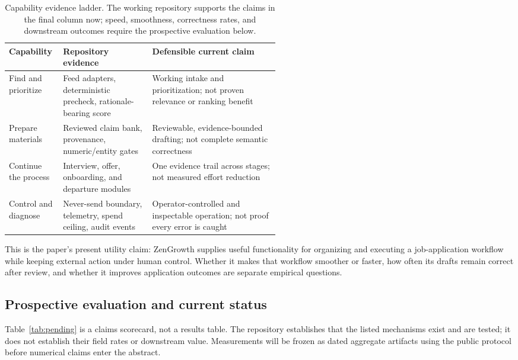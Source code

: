 \documentclass[11pt]{article}
\begin{document}
\begin{table}[H]
\centering
\footnotesize
\begin{tabularx}{\linewidth}{>{\raggedright\arraybackslash}p{0.20\linewidth}>{\raggedright\arraybackslash}p{0.33\linewidth}>{\raggedright\arraybackslash}X}
\toprule
\textbf{Capability} & \textbf{Repository evidence} & \textbf{Defensible current claim} \\
\midrule
Find and prioritize & Feed adapters, deterministic precheck, rationale-bearing score & Working intake and prioritization; not proven relevance or ranking benefit \\
Prepare materials & Reviewed claim bank, provenance, numeric/entity gates & Reviewable, evidence-bounded drafting; not complete semantic correctness \\
Continue the process & Interview, offer, onboarding, and departure modules & One evidence trail across stages; not measured effort reduction \\
Control and diagnose & Never-send boundary, telemetry, spend ceiling, audit events & Operator-controlled and inspectable operation; not proof every error is caught \\
\bottomrule
\end{tabularx}
\caption{Capability evidence ladder. The working repository supports the
claims in the final column now; speed, smoothness, correctness rates, and
downstream outcomes require the prospective evaluation below.}
\label{tab:capabilities}
\end{table}

This is the paper's present utility claim: ZenGrowth supplies useful
functionality for organizing and executing a job-application workflow while
keeping external action under human control. Whether it makes that workflow
smoother or faster, how often its drafts remain correct after review, and
whether it improves application outcomes are separate empirical questions.

\subsection{Prospective evaluation and current status}

Table~\ref{tab:pending} is a claims scorecard, not a results table. The
repository establishes that the listed mechanisms exist and are tested; it
does not establish their field rates or downstream value. Measurements will
be frozen as dated aggregate artifacts using the public protocol
\citep{zengrowth2026protocol} before numerical claims enter the abstract.
\end{document}

